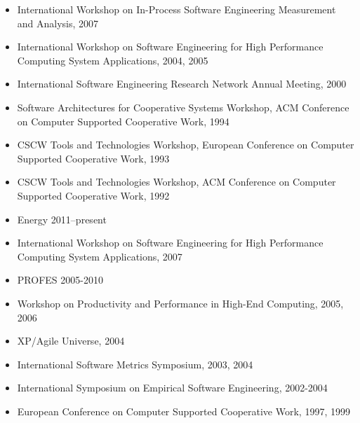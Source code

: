 \documentclass[11pt,letterpaper,sans]{moderncv} %
\begin{document}
\begin{itemize}
\item International Workshop on In-Process Software Engineering Measurement and Analysis, 2007
\item International Workshop on Software Engineering for High Performance Computing
  System Applications, 2004, 2005
\item International Software Engineering Research Network Annual Meeting, 2000
\item Software Architectures for Cooperative Systems Workshop, ACM Conference on
  Computer Supported Cooperative Work, 1994
\item CSCW Tools and Technologies Workshop, European Conference on Computer Supported
  Cooperative Work, 1993
\item CSCW Tools and Technologies Workshop, ACM Conference on Computer Supported Cooperative Work, 1992
\end{itemize}

\begin{itemize}
\item Energy 2011--present
\item International Workshop on Software Engineering for High Performance Computing
  System Applications, 2007
\item PROFES 2005-2010
\item Workshop on Productivity and Performance in High-End Computing, 2005, 2006
\item XP/Agile Universe, 2004
\item International Software Metrics Symposium, 2003, 2004
\item International Symposium on Empirical Software Engineering, 2002-2004
\item European Conference on Computer Supported Cooperative Work, 1997, 1999
\end{itemize}







\end{document}
